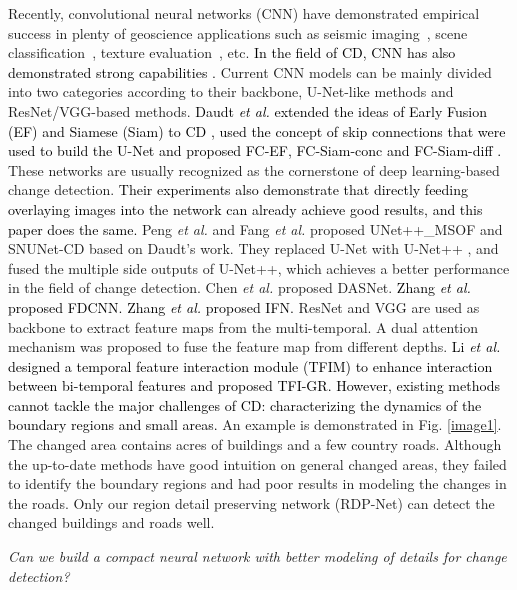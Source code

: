 \documentclass[lettersize,journal]{IEEEtran}
\newcommand{\edita}[1]{\textcolor{black}{#1}}
\newcommand{\editb}[1]{\textcolor{black}{#1}}
\newcommand{\editc}[1]{\textcolor{black}{#1}}
\begin{document}
Recently, convolutional neural networks (CNN) have demonstrated empirical success in plenty of geoscience applications such as seismic imaging~\cite{dxm+21}, scene classification~\cite{yang2021da2net}, texture evaluation~\cite{chen20213d}, etc.
\edita{In the field of CD, CNN has also demonstrated strong capabilities \cite{chen2019change,wu2021unsupervised}.}
Current CNN models can be mainly divided into two categories according to their backbone, U-Net-like \cite{ronneberger2015u} methods and ResNet/VGG-based \cite{he2016deep,simonyan2014very} methods.
\editb{Daudt \textit{et al.} extended the ideas of Early Fusion (EF) and Siamese (Siam) to CD \cite{daudt2018urban}, used the concept of skip connections that were used to build the U-Net and proposed FC-EF, FC-Siam-conc and FC-Siam-diff \cite{daudt2018fully}.}
These networks are usually recognized as the cornerstone of deep learning-based change detection.
\editb{Their experiments also demonstrate that directly feeding overlaying images into the network can already achieve good results, and this paper does the same.}
Peng \textit{et al.} \cite{peng2019end} and Fang \textit{et al.} \cite{fang2021snunet} proposed UNet++\_MSOF and SNUNet-CD based on Daudt's work.
They replaced U-Net with U-Net++ \cite{zhou2018unet++}, and fused the multiple side outputs of U-Net++, which achieves a better performance in the field of change detection.
Chen \textit{et al.} \cite{chen2020dasnet} proposed DASNet.
\editc{Zhang \textit{et al.} \cite{zhang2020feature} proposed FDCNN.
Zhang \textit{et al.} \cite{zhang2020deeply} proposed IFN.}
ResNet and VGG are used as backbone to extract feature maps from the multi-temporal.
A dual attention mechanism was proposed to fuse the feature map from different depths.
\editc{Li \textit{et al.} \cite{li2022remote} designed a temporal feature interaction module (TFIM) to enhance interaction between bi-temporal features and proposed TFI-GR.}
\edita{However, existing methods cannot tackle the major challenges of CD:
characterizing the dynamics of the boundary regions and small areas.}
An example is demonstrated in Fig. \ref{image1}. The changed area contains acres of buildings and a few country roads.
Although the up-to-date methods have good intuition on general changed areas, they failed to identify the boundary regions and had poor results in modeling the changes in the roads.
Only our region detail preserving network (RDP-Net) can detect the changed buildings and roads well.


{\it
Can we build a compact neural network with better modeling of details for change detection?
}
\end{document}
